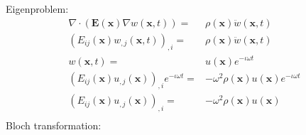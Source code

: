 \documentclass{article}
\newcommand{\imag}{\iota}
\newcommand{\vect}[1]{\boldsymbol{#1}}
\newcommand{\x}{x}
\newcommand{\vecx}{\vect{\x}}
\begin{document}
Eigenproblem:
%
\begin{align}
    \nabla \cdot \left(
        \boldsymbol{E}(\vecx) \nabla w(\vecx, t)
    \right) =& \rho(\vecx) \ddot{w}(\vecx, t) \nonumber \\
    \left(
        E_{ij}(\vecx) w_{,j}(\vecx, t)
    \right)_{,i} =& \rho(\vecx) \ddot{w}(\vecx, t) \nonumber \\
    w(\vecx, t) =& u(\vecx) e^{-\imag \omega t} \nonumber \\
    \left(
        E_{ij}(\vecx) u_{,j}(\vecx)
    \right)_{,i} e^{-\imag \omega t} =& -\omega^2 \rho(\vecx) u(\vecx) e^{
        -\imag \omega t
    } \nonumber \\
    \left(
        E_{ij}(\vecx) u_{,j}(\vecx)
    \right)_{,i} =& -\omega^2 \rho(\vecx) u(\vecx) \\
\end{align}
%
Bloch transformation:
%
\end{document}
